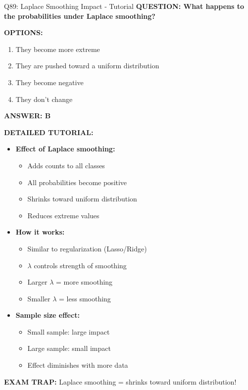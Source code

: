 \documentclass[8pt]{beamer}
\begin{document}
	\begin{frame}{Q89: Laplace Smoothing Impact - Tutorial}
		\fontsize{6.5}{7.5}\selectfont
		\textbf{QUESTION: What happens to the probabilities under Laplace smoothing?}
		
		\vspace{0.1cm}
		\textbf{OPTIONS:}
		\begin{enumerate}
			\item They become more extreme
			\item They are pushed toward a uniform distribution
			\item They become negative
			\item They don't change
		\end{enumerate}
		
		\vspace{0.1cm}
		\textcolor{myblue}{\textbf{ANSWER: B}}
		
		\vspace{0.1cm}
		\textbf{DETAILED TUTORIAL:}
		\begin{itemize}
			\item \textbf{Effect of Laplace smoothing:}
			\begin{itemize}
				\item Adds counts to all classes
				\item All probabilities become positive
				\item Shrinks toward uniform distribution
				\item Reduces extreme values
			\end{itemize}
			\item \textbf{How it works:}
			\begin{itemize}
				\item Similar to regularization (Lasso/Ridge)
				\item $\lambda$ controls strength of smoothing
				\item Larger $\lambda$ = more smoothing
				\item Smaller $\lambda$ = less smoothing
			\end{itemize}
			\item \textbf{Sample size effect:}
			\begin{itemize}
				\item Small sample: large impact
				\item Large sample: small impact
				\item Effect diminishes with more data
			\end{itemize}
		\end{itemize}
		
		\textcolor{myred}{\textbf{EXAM TRAP:}} Laplace smoothing = \textcolor{myblue}{shrinks toward uniform distribution}!
	\end{frame}
	
\end{document}
